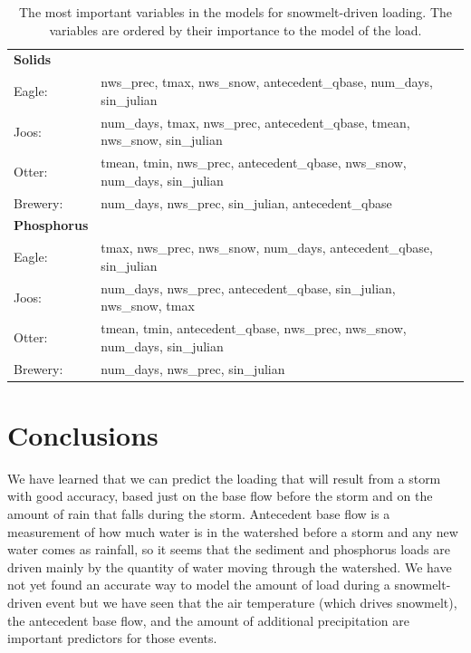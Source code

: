 \documentclass[12pt]{article}
\begin{document}
\begin{table}[h!]\small
    \begin{center}
    \begin{tabular}{ll}
        \textbf{Solids} & \\
        \hspace{5mm} Eagle: & nws\_prec, tmax, nws\_snow, antecedent\_qbase, num\_days, sin\_julian\\
        \hspace{5mm} Joos: & num\_days, tmax, nws\_prec, antecedent\_qbase, tmean, nws\_snow, sin\_julian\\
        \hspace{5mm} Otter: & tmean, tmin, nws\_prec, antecedent\_qbase, nws\_snow, num\_days, sin\_julian\\
        \hspace{5mm} Brewery: & num\_days, nws\_prec, sin\_julian, antecedent\_qbase
    \vspace{2mm}\\
        \textbf{Phosphorus} & \\
        \hspace{5mm} Eagle: & tmax, nws\_prec, nws\_snow, num\_days, antecedent\_qbase, sin\_julian\\
        \hspace{5mm} Joos: & num\_days, nws\_prec, antecedent\_qbase, sin\_julian, nws\_snow, tmax\\
        \hspace{5mm} Otter: & tmean, tmin, antecedent\_qbase, nws\_prec, nws\_snow, num\_days, sin\_julian\\
        \hspace{5mm} Brewery: & num\_days, nws\_prec, sin\_julian\\
    \end{tabular}
    \caption{The most important variables in the models for snowmelt-driven loading. The variables are ordered by their importance to the model of the load. \label{snow_predictor_list}}
    \end{center}
\end{table}

\section{Conclusions}
We have learned that we can predict the loading that will result from a storm with good accuracy, based just on the base flow before the storm and on the amount of rain that falls during the storm. Antecedent base flow is a measurement of how much water is in the watershed before a storm and any new water comes as rainfall, so it seems that the sediment and phosphorus loads are driven mainly by the quantity of water moving through the watershed. We have not yet found an accurate way to model the amount of load during a snowmelt-driven event but we have seen that the air temperature (which drives snowmelt), the antecedent base flow, and the amount of additional precipitation are important predictors for those events.\\
\end{document}
